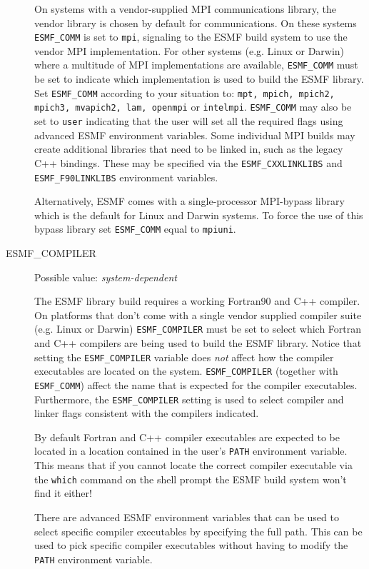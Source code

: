 \begin{description}
On systems with a vendor-supplied MPI communications library, the vendor library
is chosen by default for communications. On these systems {\tt ESMF\_COMM} is
set to {\tt mpi}, signaling to the ESMF build system to use the vendor MPI
implementation.
For other systems (e.g. Linux or Darwin) where a multitude of MPI
implementations are available, {\tt ESMF\_COMM} must be set to indicate which
implementation is used to build the ESMF library. Set {\tt ESMF\_COMM} according
to your situation to: {\tt mpt, mpich, mpich2, mpich3, mvapich2, lam, openmpi}
or {\tt intelmpi}. {\tt ESMF\_COMM} may also be set to {\tt user} indicating
that the user will set all the required flags using advanced ESMF environment
variables.  Some individual MPI builds may create additional libraries that
need to be linked in, such as the legacy C++ bindings. These may be specified
via the {\tt ESMF\_CXXLINKLIBS} and {\tt ESMF\_F90LINKLIBS} environment
variables.

Alternatively, ESMF comes with a single-processor MPI-bypass library which is
the default for Linux and Darwin systems. To force the use of this bypass
library set {\tt ESMF\_COMM} equal to {\tt mpiuni}.

\item[ESMF\_COMPILER]
Possible value: {\em system-dependent}

The ESMF library build requires a working Fortran90 and C++ compiler. On
platforms that don't come with a single vendor supplied compiler suite
(e.g. Linux or Darwin) {\tt ESMF\_COMPILER} must be set to select which Fortran
and C++ compilers are being used to build the ESMF library. Notice that setting
the {\tt ESMF\_COMPILER} variable does {\em not} affect how the compiler
executables are located on the system. {\tt ESMF\_COMPILER} (together with
{\tt ESMF\_COMM}) affect the name that is expected for the compiler executables.
Furthermore, the {\tt ESMF\_COMPILER} setting is used to select compiler and
linker flags consistent with the compilers indicated.

By default Fortran and C++ compiler executables are expected to be located in
a location contained in the user's {\tt PATH} environment variable. This means
that if you cannot locate the correct compiler executable via the {\tt which}
command on the shell prompt the ESMF build system won't find it either!

There are advanced ESMF environment variables that can be used to select
specific compiler executables by specifying the full path. This can be used to
pick specific compiler executables without having to modify the {\tt PATH}
environment variable.


\end{description}

